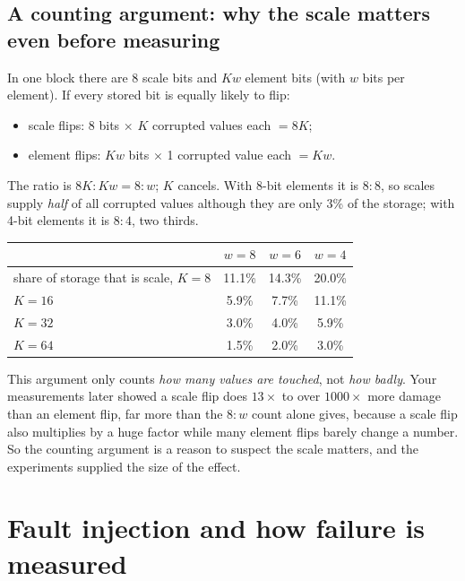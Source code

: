 \subsection{A counting argument: why the scale matters even before measuring}
In one block there are 8 scale bits and $Kw$ element bits (with $w$ bits per element). If every stored bit is equally
likely to flip:
\begin{itemize}
\item scale flips: 8 bits $\times$ $K$ corrupted values each $=8K$;
\item element flips: $Kw$ bits $\times$ 1 corrupted value each $=Kw$.
\end{itemize}
The ratio is $8K:Kw=8:w$; $K$ cancels. With 8-bit elements it is $8:8$, so scales supply \emph{half} of all
corrupted values although they are only 3\% of the storage; with 4-bit elements it is $8:4$, two thirds.

\begin{center}\small
\begin{tabular}{lccc}
\toprule
 & $w=8$ & $w=6$ & $w=4$ \\
\midrule
share of storage that is scale, $K=8$ & 11.1\% & 14.3\% & 20.0\% \\
$K=16$ & 5.9\% & 7.7\% & 11.1\% \\
$K=32$ & 3.0\% & 4.0\% & 5.9\% \\
$K=64$ & 1.5\% & 2.0\% & 3.0\% \\
\bottomrule
\end{tabular}
\end{center}

\begin{careful}
This argument only counts \emph{how many values are touched}, not \emph{how badly}. Your measurements later
showed a scale flip does $13\times$ to over $1000\times$ more damage than an element flip, far more than the
$8:w$ count alone gives, because a scale flip also multiplies by a huge factor while many element flips barely change a
number. So the counting argument is a reason to suspect the scale matters, and the experiments supplied the size of the effect.
\end{careful}

\section{Fault injection and how failure is measured}
\label{sec:metrics}

